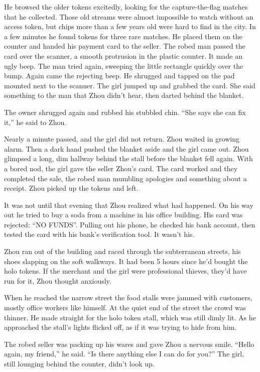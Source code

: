 \documentclass[10pt,a4paper]{article}
\begin{document}
He browsed the older tokens excitedly, looking for the
capture-the-flag matches that he collected. Those old streams
were almost impossible to watch without an access token, but chips
more than a few years old were hard to find in the city. In a few
minutes he found tokens for three rare matches. He placed them on
the counter and handed his payment card to the seller. The robed
man passed the card over the scanner, a smooth protrusion in the
plastic counter. It made an ugly beep. The man tried again, sweeping
the little rectangle quickly over the bump. Again came the rejecting
beep. He shrugged and tapped on the pad mounted next to the scanner.
The girl jumped up and grabbed the card. She said something to the
man that Zhou didn't hear, then darted behind the blanket.

The owner shrugged again and rubbed his stubbled chin. ``She says
she can fix it,'' he said to Zhou.

Nearly a minute passed, and the girl did not return. Zhou waited in
growing alarm. Then a dark hand pushed the blanket aside and the
girl came out. Zhou glimpsed a long, dim hallway behind the stall
before the blanket fell again. With a bored nod, the girl gave the
seller Zhou's card. The card worked and they completed the sale,
the robed man mumbling apologies and something about a receipt. Zhou
picked up the tokens and left.

It was not until that evening that Zhou realized what had
happened. On his way out he tried to buy a soda from a machine in
his office building. His card was rejected: ``NO FUNDS''. Pulling out
his phone, he checked his bank account, then tested the card with
his bank's verification tool. It wasn't his.

Zhou ran out of the building and raced through the subterranean
streets, his shoes slapping on the soft walkways. It had been
5 hours since he'd bought the holo tokens. If the merchant and
the girl were professional thieves, they'd have run for it, Zhou
thought anxiously.

When he reached the narrow street the food stalls were jammed
with customers, mostly office workers like himself. At the quiet
end of the street the crowd was thinner. He made straight for the
holo token stall, which was still dimly lit. As he approached the
stall's lights flicked off, as if it was trying to hide from him.

The robed seller was packing up his wares and gave Zhou a nervous
smile. ``Hello again, my friend,'' he said. ``Is there anything else
I can do for you?'' The girl, still lounging behind the counter,
didn't look up.
\end{document}
